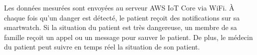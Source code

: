 \begin{flushleft}
	Les données mesurées sont envoyées au serveur AWS IoT Core via WiFi. À chaque fois qu'un danger est détecté, le patient reçoit des notifications sur sa smartwatch. Si la situation du patient est très dangereuse, un membre de sa famille reçoit un appel ou un message pour sauver le patient. De plus, le médecin du patient peut suivre en temps réel la situation de son patient.\newline
	\newpage
\end{flushleft}